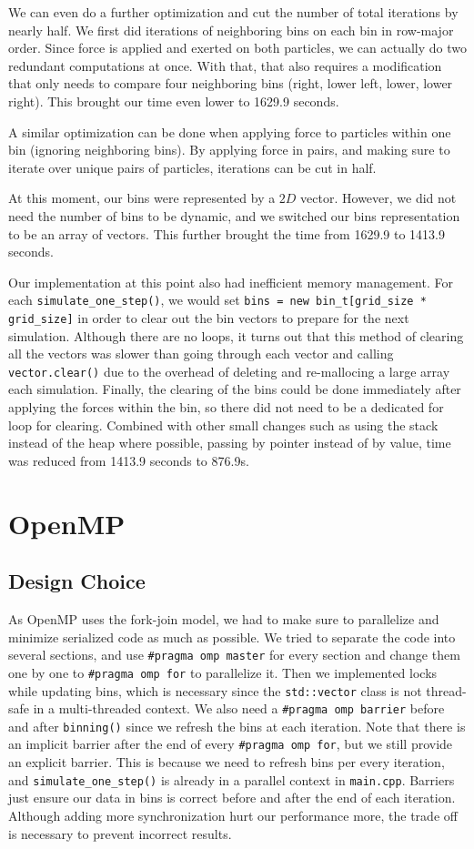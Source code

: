 \documentclass{article}
\begin{document}
We can even do a further optimization and cut the number of total iterations by nearly half. We first did iterations of neighboring bins on each bin in row-major order. Since force is applied and exerted on both particles, we can actually do two redundant computations at once. With that, that also requires a modification that only needs to compare four neighboring bins (right, lower left, lower, lower right). This brought our time even lower to 1629.9 seconds.

A similar optimization can be done when applying force to particles within one bin (ignoring neighboring bins). By applying force in pairs, and making sure to iterate over unique pairs of particles, iterations can be cut in half.

At this moment, our bins were represented by a $2D$ vector. However, we did not need the number of bins to be dynamic, and we switched our bins representation to be an array of vectors. This further brought the time from 1629.9 to 1413.9 seconds.

Our implementation at this point also had inefficient memory management. For each \verb|simulate_one_step()|, we would set \verb|bins = new bin_t[grid_size * grid_size]| in order to clear out the bin vectors to prepare for the next simulation. Although there are no loops, it turns out that this method of clearing all the vectors was slower than going through each vector and calling \verb|vector.clear()| due to the overhead of deleting and re-mallocing a large array each simulation. Finally, the clearing of the bins could be done immediately after applying the forces within the bin, so there did not need to be a dedicated for loop for clearing. Combined with other small changes such as using the stack instead of the heap where possible, passing by pointer instead of by value, time was reduced from 1413.9 seconds to 876.9s.

\section{OpenMP}
\subsection{Design Choice}
As OpenMP uses the fork-join model, we had to make sure to parallelize and minimize serialized code as much as possible. We tried to separate the code into several sections, and use \verb|#pragma omp master| for every section and change them one by one to \verb|#pragma omp for| to parallelize it. Then we implemented locks while updating bins, which is necessary since the \verb|std::vector| class is not thread-safe in a multi-threaded context. We also need a \verb|#pragma omp barrier| before and after \verb|binning()| since we refresh the bins at each iteration. Note that there is an implicit barrier after the end of every \verb|#pragma omp for|, but we still provide an explicit barrier. This is because we need to refresh bins per every iteration, and \verb|simulate_one_step()| is already in a parallel context in \verb|main.cpp|. Barriers just ensure our data in bins is correct before and after the end of each iteration. Although adding more synchronization hurt our performance more, the trade off is necessary to prevent incorrect results.
\end{document}
